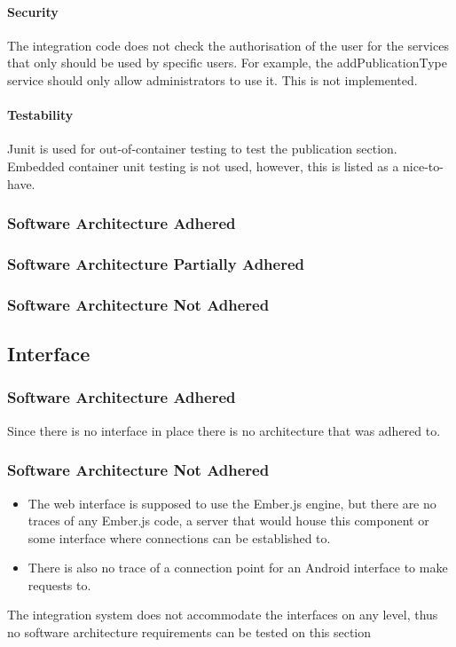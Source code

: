 \documentclass{article}
\begin{document}
            \paragraph{Security}
            The integration code does not check the authorisation of the user for the services that only should be used by specific users. For example, the addPublicationType service should only allow administrators to use it. This is not implemented.
            
            \paragraph{Testability}
            Junit is used for out-of-container testing to test the publication section. Embedded container unit testing is not used, however, this is listed as a nice-to-have.
        \subsubsection{Software Architecture Adhered}
        \subsubsection{Software Architecture Partially Adhered}
        \subsubsection{Software Architecture Not Adhered}       
		
	\subsection{Interface}
		\subsubsection{Software Architecture Adhered}
			Since there is no interface in place there is no architecture that was adhered to.
		\subsubsection{Software Architecture Not Adhered}
			\begin{itemize}	
				\item The web interface is supposed to use the Ember.js engine, but there are no traces of any Ember.js code, a server that would house this component or some interface where connections can be established to.
				\item There is also no trace of a connection point for an Android interface to make requests to.
			\end{itemize}
			The integration system does not accommodate the interfaces on any level, thus no software architecture requirements can be tested on this section
\end{document}
